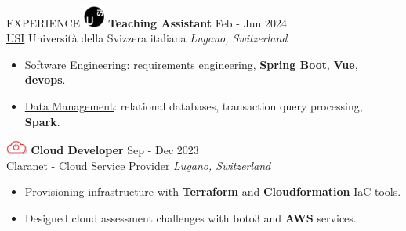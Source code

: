 \documentclass{cv} %
\def\intraexpvspace{0.15cm}
\begin{document}
\begin{minipage}[b][0.9\paperheight][t]{0.7\linewidth}
\begin{rSection}{EXPERIENCE}
    \includegraphics[width=0.7cm, trim={0cm 10cm 0cm 0cm}]{usi-icon.png}
    \hspace*{0cm}\textbf{Teaching Assistant} \hfill Feb - Jun 2024\\
    \hspace*{0.85cm}\href{https://www.usi.ch/}{USI} Università della Svizzera italiana
    \hfill \textit{Lugano, Switzerland}
    \begin{itemize}
        \item \href{https://search.usi.ch/it/corsi/35268192/software-atelier-4-software-engineering-project}{Software Engineering}: 
        requirements engineering, \textbf{Spring Boot}, \textbf{Vue}, \textbf{devops}.

        \item \href{https://search.usi.ch/it/corsi/35268184/data-management}{Data Management}: 
        relational databases, transaction query processing, \textbf{Spark}.
    \end{itemize}
    \vspace{\intraexpvspace}
    \vspace{\intraexpvspace}

    \includegraphics[width=0.7cm, trim={0cm 15cm 0cm 0cm}]{claranet-logo.png}
    \textbf{Cloud Developer} \hfill Sep - Dec 2023\\
    \hspace*{0.85cm}\href{https://www.claranet.com/}{Claranet} - Cloud Service Provider
    \hfill \textit{Lugano, Switzerland}
    \begin{itemize}
        \item Provisioning infrastructure with \textbf{Terraform} and \textbf{Cloudformation}
            IaC tools.

        \item Designed cloud assessment challenges with boto3 and \textbf{AWS} services.
    \end{itemize}
    \vspace{\intraexpvspace}
    \vspace{\intraexpvspace}


\end{rSection}
\end{minipage}
\end{document}
